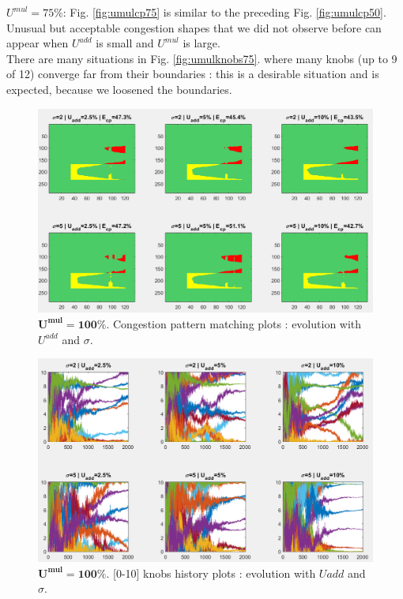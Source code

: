 \emph{$U^{mul}=75\% $}: Fig. \ref{fig:umulcp75} is similar to the preceding Fig. \ref{fig:umulcp50}. Unusual but acceptable congestion shapes that we did not observe before can appear when $U^{add}$ is small and $U^{mul}$  is large. \\
There are many situations in Fig. \ref{fig:umulknobs75}. where many knobs (up to 9 of 12) converge far from their boundaries : this is a desirable situation and is expected, because we loosened the boundaries.\newpage
\begin{figure}[!h]
	\centering
	\caption{$\mathbf{U^{mul}=100\%}$. Congestion pattern matching plots : evolution with $U^{add}$ and $\sigma$.}
	\label{fig:umulcp100}
	\includegraphics[width=6.8in]{figures/results_figures/Umul/cp_Umul_100_lambda_11.png}
\end{figure}
\begin{figure}[!h]
	\centering
	\caption{$\mathbf{U^{mul}=100\%}$. [0-10] knobs history plots : evolution with $U{add}$ and $\sigma$.}
	\label{fig:umulknobs100}
	\includegraphics[width=7in]{figures/results_figures/Umul/knobs_Umul_100_lambda_11.png}
\end{figure}	

